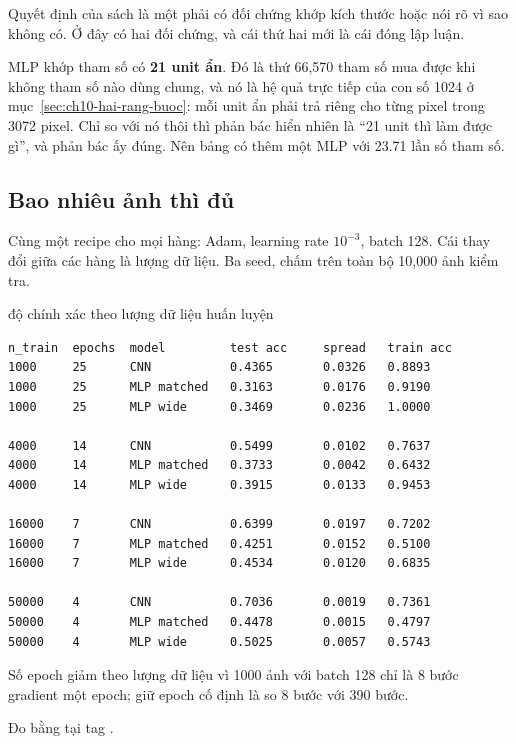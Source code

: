 Quyết định của sách là một  phải có đối chứng khớp
kích thước hoặc nói rõ vì sao không có. Ở đây có hai đối chứng, và cái thứ hai mới là cái đóng
lập luận.

MLP khớp tham số có \textbf{21 unit ẩn}. Đó là thứ 66,570 tham số mua được khi
không tham số nào dùng chung, và nó là hệ quả trực tiếp của con số 1024 ở
mục~\ref{sec:ch10-hai-rang-buoc}: mỗi unit ẩn phải trả riêng cho từng pixel
trong 3072 pixel. Chỉ so với nó thôi thì phản bác hiển nhiên là \enquote{21
unit thì làm được gì}, và phản bác ấy đúng. Nên bảng có thêm một MLP với 23.71
lần số tham số.

\subsection*{Bao nhiêu ảnh thì đủ}

%
Cùng một recipe cho mọi hàng: Adam, learning rate \(10^{-3}\), batch 128. Cái
thay đổi giữa các hàng là lượng dữ liệu. Ba seed, chấm trên toàn bộ 10,000 ảnh
kiểm tra.

\begin{measured}{độ chính xác theo lượng dữ liệu huấn luyện}
\begin{verbatim}
n_train  epochs  model         test acc     spread   train acc
1000     25      CNN           0.4365       0.0326   0.8893
1000     25      MLP matched   0.3163       0.0176   0.9190
1000     25      MLP wide      0.3469       0.0236   1.0000

4000     14      CNN           0.5499       0.0102   0.7637
4000     14      MLP matched   0.3733       0.0042   0.6432
4000     14      MLP wide      0.3915       0.0133   0.9453

16000    7       CNN           0.6399       0.0197   0.7202
16000    7       MLP matched   0.4251       0.0152   0.5100
16000    7       MLP wide      0.4534       0.0120   0.6835

50000    4       CNN           0.7036       0.0019   0.7361
50000    4       MLP matched   0.4478       0.0015   0.4797
50000    4       MLP wide      0.5025       0.0057   0.5743
\end{verbatim}

Số epoch giảm theo lượng dữ liệu vì 1000 ảnh với batch 128 chỉ là 8 bước
gradient một epoch; giữ epoch cố định là so 8 bước với 390 bước.

Đo bằng  tại tag .
\end{measured}

